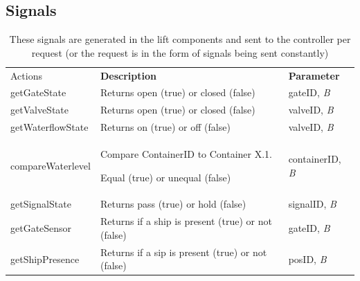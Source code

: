 		\subsection{Signals}
		\begin{table}[htbp]
			\centering
			\caption{These signals are generated in the lift components and sent to the controller per request (or the request is in the form of signals being sent constantly)}
			\begin{tabular}{lll}
				\toprule
				Actions & \textbf{Description} & \textbf{Parameter} \\
				getGateState & Returns open (true) or closed (false) & gateID, \textit{B} \\
				getValveState & Returns open (true) or closed (false) & valveID, \textit{B} \\
				getWaterflowState & Returns on (true) or off (false) & valveID, \textit{B} \\
				compareWaterlevel & \parbox[t]{3in}{Compare ContainerID to Container X.1. \par Equal (true) or unequal (false)} & containerID, \textit{B} \\
				getSignalState & Returns pass (true) or hold (false) & signalID, \textit{B} \\
				getGateSensor & Returns if a ship is present (true) or not (false) & gateID, \textit{B} \\
				getShipPresence  & Returns if a sip is present (true) or not (false) & posID, \textit{B} \\
				\bottomrule
				\end{tabular}%
				\label{tab:addlabel}%
				\end{table}%
				
				
